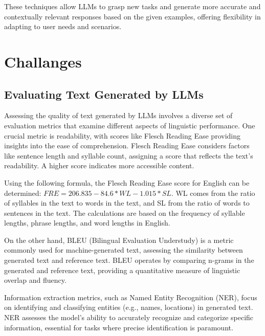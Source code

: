 These techniques allow LLMs to grasp new tasks and generate more accurate and contextually relevant responses based on the given examples, offering flexibility in adapting to user needs and scenarios.

\section{Challanges}

\subsection{Evaluating Text Generated by LLMs}

Assessing the quality of text generated by LLMs involves a diverse set of evaluation metrics that examine different aspects of linguistic performance. One crucial metric is readability, with scores like Flesch Reading Ease providing insights into the ease of comprehension. Flesch Reading Ease considers factors like sentence length and syllable count, assigning a score that reflects the text's readability. A higher score indicates more accessible content.

Using the following formula, the Flesch Reading Ease score for English can be determined: 
$ FRE = 206.835 - 84.6 * WL - 1.015 * SL $. WL comes from the ratio of syllables in the text to words in the text, and SL from the ratio of words to sentences in the text. The calculations are based on the frequency of syllable lengths, phrase lengths, and word lengths in English.\cite{RyteWiki}


On the other hand, BLEU (Bilingual Evaluation Understudy) is a metric commonly used for machine-generated text, assessing the similarity between generated text and reference text. BLEU operates by comparing n-grams in the generated and reference text, providing a quantitative measure of linguistic overlap and fluency.\cite{Bleu}

Information extraction metrics, such as Named Entity Recognition (NER), focus on identifying and classifying entities (e.g., names, locations) in generated text. NER assesses the model's ability to accurately recognize and categorize specific information, essential for tasks where precise identification is paramount.\cite{Ner}

